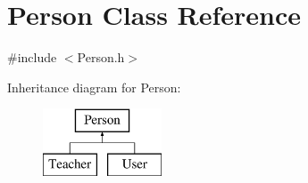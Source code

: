 \hypertarget{class_person}{}\section{Person Class Reference}
\label{class_person}


{\ttfamily \#include $<$Person.\+h$>$}

Inheritance diagram for Person\+:\begin{figure}[H]
\begin{center}
\leavevmode
\includegraphics[height=2.000000cm]{class_person}
\end{center}
\end{figure}
